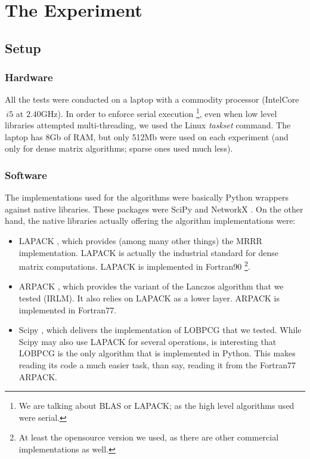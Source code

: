 \chapter{The Experiment}

\section{Setup}

\subsection{Hardware}

All the tests were conducted on a laptop with a commodity processor
(Intel\textregistered Core\texttrademark $\,i5$ at $2.40$GHz). In
order to enforce serial execution \footnote{We are talking about BLAS
  or LAPACK; as the high level algorithms used were serial.}, even
when low level libraries attempted multi-threading, we used the Linux
\emph{taskset} command. The laptop has $8$Gb of RAM, but only 512Mb
were used on each experiment (and only for dense matrix algorithms;
sparse ones used much less). \\

\subsection{Software}

The implementations used for the algorithms were basically Python
wrappers against native libraries. These packages were SciPy
\cite{scipy} and NetworkX \cite{networkx}. On the other hand, the
native libraries actually offering the algorithm implementations were:

\begin{itemize}
  \item LAPACK \cite{lapack}, which provides (among many other things)
    the MRRR implementation. LAPACK is actually the industrial
    standard for dense matrix computations. LAPACK is implemented in
    Fortran90 \footnote{At least the opensource version we used, as
      there are other commercial implementations as well.}.

  \item ARPACK \cite{arpack}, which provides the variant of the
    Lanczos algorithm that we tested (IRLM). It also relies on LAPACK
    as a lower layer. ARPACK is implemented in Fortran77.

  \item Scipy \cite{scipy}, which delivers the implementation of
    LOBPCG that we tested. While Scipy may also use LAPACK for several
    operations, is interesting that LOBPCG is the only algorithm that
    is implemented in Python. This makes reading its code a much
    easier task, than say, reading it from the Fortran77 ARPACK. 
\end{itemize}

